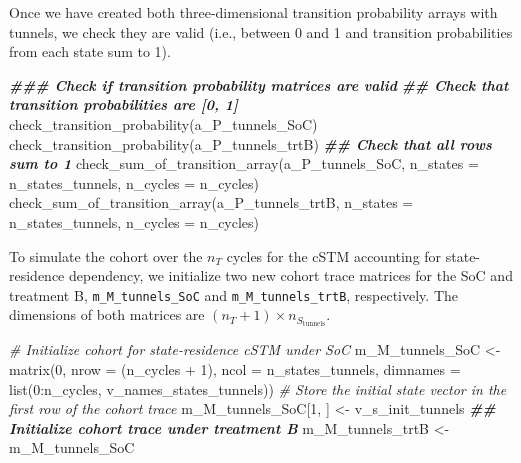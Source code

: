 \documentclass[
]{article}
\newenvironment{Shaded}{\begin{snugshade}}{\end{snugshade}}
\newcommand{\AttributeTok}[1]{\textcolor[rgb]{0.77,0.63,0.00}{#1}}
\newcommand{\CommentTok}[1]{\textcolor[rgb]{0.56,0.35,0.01}{\textit{#1}}}
\newcommand{\DecValTok}[1]{\textcolor[rgb]{0.00,0.00,0.81}{#1}}
\newcommand{\DocumentationTok}[1]{\textcolor[rgb]{0.56,0.35,0.01}{\textbf{\textit{#1}}}}
\newcommand{\FunctionTok}[1]{\textcolor[rgb]{0.00,0.00,0.00}{#1}}
\newcommand{\NormalTok}[1]{#1}
\newcommand{\OtherTok}[1]{\textcolor[rgb]{0.56,0.35,0.01}{#1}}
\newcommand{\SpecialCharTok}[1]{\textcolor[rgb]{0.00,0.00,0.00}{#1}}
\begin{document}
Once we have created both three-dimensional transition probability arrays with tunnels, we check they are valid (i.e., between 0 and 1 and transition probabilities from each state sum to 1).

\begin{Shaded}
\begin{Highlighting}[]
\DocumentationTok{\#\#\# Check if transition probability matrices are valid}
\DocumentationTok{\#\# Check that transition probabilities are [0, 1]}
\FunctionTok{check\_transition\_probability}\NormalTok{(a\_P\_tunnels\_SoC)}
\FunctionTok{check\_transition\_probability}\NormalTok{(a\_P\_tunnels\_trtB)}
\DocumentationTok{\#\# Check that all rows sum to 1}
\FunctionTok{check\_sum\_of\_transition\_array}\NormalTok{(a\_P\_tunnels\_SoC, }\AttributeTok{n\_states =}\NormalTok{ n\_states\_tunnels, }
                              \AttributeTok{n\_cycles =}\NormalTok{ n\_cycles)}
\FunctionTok{check\_sum\_of\_transition\_array}\NormalTok{(a\_P\_tunnels\_trtB, }\AttributeTok{n\_states =}\NormalTok{ n\_states\_tunnels, }
                              \AttributeTok{n\_cycles =}\NormalTok{ n\_cycles)}
\end{Highlighting}
\end{Shaded}

To simulate the cohort over the \(n_T\) cycles for the cSTM accounting for state-residence dependency, we initialize two new cohort trace matrices for the SoC and treatment B, \texttt{m\_M\_tunnels\_SoC} and \texttt{m\_M\_tunnels\_trtB}, respectively. The dimensions of both matrices are \((n_T+1) \times n_{S_{\text{tunnels}}}\).

\begin{Shaded}
\begin{Highlighting}[]
\CommentTok{\# Initialize cohort for state{-}residence cSTM under SoC}
\NormalTok{m\_M\_tunnels\_SoC }\OtherTok{\textless{}{-}} \FunctionTok{matrix}\NormalTok{(}\DecValTok{0}\NormalTok{, }
                      \AttributeTok{nrow =}\NormalTok{ (n\_cycles }\SpecialCharTok{+} \DecValTok{1}\NormalTok{), }\AttributeTok{ncol =}\NormalTok{ n\_states\_tunnels, }
                      \AttributeTok{dimnames =} \FunctionTok{list}\NormalTok{(}\DecValTok{0}\SpecialCharTok{:}\NormalTok{n\_cycles, v\_names\_states\_tunnels))}
\CommentTok{\# Store the initial state vector in the first row of the cohort trace}
\NormalTok{m\_M\_tunnels\_SoC[}\DecValTok{1}\NormalTok{, ] }\OtherTok{\textless{}{-}}\NormalTok{ v\_s\_init\_tunnels}
\DocumentationTok{\#\# Initialize cohort trace under treatment B}
\NormalTok{m\_M\_tunnels\_trtB }\OtherTok{\textless{}{-}}\NormalTok{ m\_M\_tunnels\_SoC}
\end{Highlighting}
\end{Shaded}
\end{document}
